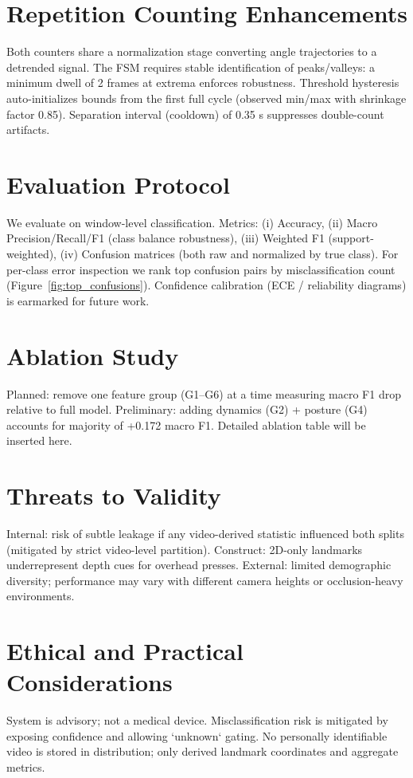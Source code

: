 \documentclass[conference]{IEEEtran}
\begin{document}
\section{Repetition Counting Enhancements}
Both counters share a normalization stage converting angle trajectories to a detrended signal. The FSM requires stable identification of peaks/valleys: a minimum dwell of 2 frames at extrema enforces robustness. Threshold hysteresis auto-initializes bounds from the first full cycle (observed min/max with shrinkage factor 0.85). Separation interval (cooldown) of 0.35 s suppresses double-count artifacts.

\section{Evaluation Protocol}
We evaluate on window-level classification. Metrics: (i) Accuracy, (ii) Macro Precision/Recall/F1 (class balance robustness), (iii) Weighted F1 (support-weighted), (iv) Confusion matrices (both raw and normalized by true class). For per-class error inspection we rank top confusion pairs by misclassification count (Figure~\ref{fig:top_confusions}). Confidence calibration (ECE / reliability diagrams) is earmarked for future work.


\section{Ablation Study}\label{sec:ablation}
Planned: remove one feature group (G1--G6) at a time measuring macro F1 drop relative to full model. Preliminary: adding dynamics (G2) + posture (G4) accounts for majority of +0.172 macro F1. Detailed ablation table will be inserted here.

\section{Threats to Validity}
Internal: risk of subtle leakage if any video-derived statistic influenced both splits (mitigated by strict video-level partition). Construct: 2D-only landmarks underrepresent depth cues for overhead presses. External: limited demographic diversity; performance may vary with different camera heights or occlusion-heavy environments.

\section{Ethical and Practical Considerations}
System is advisory; not a medical device. Misclassification risk is mitigated by exposing confidence and allowing `unknown` gating. No personally identifiable video is stored in distribution; only derived landmark coordinates and aggregate metrics.
\end{document}
